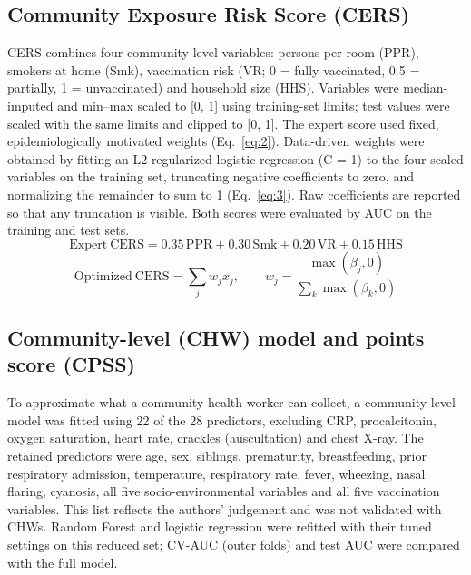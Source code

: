 \documentclass[a4paper,fleqn]{cas-dc}
\begin{document}
\subsection{Community Exposure Risk Score (CERS)}

CERS combines four community-level variables: persons-per-room (PPR), smokers at home (Smk), vaccination risk (VR; 0 = fully vaccinated, 0.5 = partially, 1 = unvaccinated) and household size (HHS). Variables were median-imputed and min--max scaled to [0, 1] using training-set limits; test values were scaled with the same limits and clipped to [0, 1]. The expert score used fixed, epidemiologically motivated weights (Eq.~\ref{eq:2}). Data-driven weights were obtained by fitting an L2-regularized logistic regression (C = 1) to the four scaled variables on the training set, truncating negative coefficients to zero, and normalizing the remainder to sum to 1 (Eq.~\ref{eq:3}). Raw coefficients are reported so that any truncation is visible. Both scores were evaluated by AUC on the training and test sets.
\begin{equation}
\mathrm{Expert\ CERS}=0.35\,\mathrm{PPR}+0.30\,\mathrm{Smk}+0.20\,\mathrm{VR}+0.15\,\mathrm{HHS}
\label{eq:2}
\end{equation}
\begin{equation}
\mathrm{Optimized\ CERS}=\sum_j w_j x_j,\qquad w_j=\frac{\max(\beta_j,0)}{\sum_k \max(\beta_k,0)}
\label{eq:3}
\end{equation}

\subsection{Community-level (CHW) model and points score (CPSS)}
\label{sec:chwm}

To approximate what a community health worker can collect, a community-level model was fitted using 22 of the 28 predictors, excluding CRP, procalcitonin, oxygen saturation, heart rate, crackles (auscultation) and chest X-ray. The retained predictors were age, sex, siblings, prematurity, breastfeeding, prior respiratory admission, temperature, respiratory rate, fever, wheezing, nasal flaring, cyanosis, all five socio-environmental variables and all five vaccination variables. This list reflects the authors’ judgement and was not validated with CHWs. Random Forest and logistic regression were refitted with their tuned settings on this reduced set; CV-AUC (outer folds) and test AUC were compared with the full model.
\end{document}
